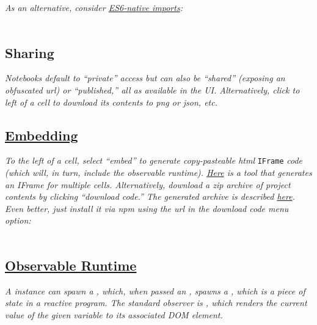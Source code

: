 \textit{As an alternative, consider \href{https://exploringjs.com/es6/ch\_modules.html}{ES6-native imports}:}\\
\\


\subsection*{Sharing}
\textit{Notebooks default to ``private'' access but can also be ``shared'' (exposing an obfuscated url) or ``published,'' all as available in the UI. Alternatively, click to left of a cell to download its contents to png or json, etc.}


\subsection*{\href{https://observablehq.com/@observablehq/introduction-to-embedding?collection=@observablehq/embedding-notebooks}{Embedding}}
\textit{To the left of a cell, select ``embed'' to generate copy-pasteable html }\texttt{IFrame}\textit{ code (which will, in turn, include the observable runtime). \href{https://observablehq.com/@jashkenas/handy-embed-code-generator}{Here} is a tool that generates an IFrame for multiple cells. Alternatively, download a zip archive of project contents by clicking ``download code.'' The generated archive is described \href{https://www.tophtucker.com/observable-docco/index.js.html}{here}. Even better, just install it via npm using the url in the download code menu option:}\\
\\


\subsection*{\href{https://observablehq.com/@observablehq/downloading-and-embedding-notebooks}{Observable Runtime}}
{\it A {\rm \href{https://github.com/observablehq/runtime}{}} instance can spawn a {\rm\tt {}}, which, when passed an {\rm \href{https://github.com/observablehq/runtime#modules}{}}, spawns a {\rm \href{https://github.com/observablehq/runtime#variables}{}}, which is a piece of state in a reactive program. The standard observer is {\rm\tt \href{https://github.com/observablehq/inspector}{}}, which renders the current value of the given variable to its associated DOM element.}

